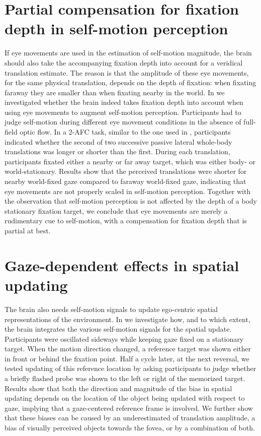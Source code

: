 \section{Partial compensation for fixation depth in self-motion perception}
If eye movements are used in the estimation of self-motion magnitude, the brain should also take the accompanying fixation depth into account for a veridical translation estimate. The reason is that the amplitude of these eye movements, for the same physical translation, depends on the depth of fixation: when fixating faraway they are smaller than when fixating nearby in the world.  In  we investigated whether the brain indeed takes fixation depth into account when using eye movements to augment self-motion perception. Participants had to judge self-motion during different eye movement conditions in the absence of full-field optic flow. In a 2-AFC task, similar to the one used in , participants indicated whether the second of two successive passive lateral whole-body translations was longer or shorter than the first. During each translation, participants fixated either a nearby or far away target, which was either body- or world-stationary. Results show that the perceived translations were shorter for nearby world-fixed gaze compared to faraway world-fixed gaze, indicating that eye movements are not properly scaled in self-motion perception. Together with the observation that self-motion perception is not affected by the depth of a body stationary fixation target, we conclude that eye movements are merely a rudimentary cue to self-motion, with a compensation for fixation depth that is partial at best.

\section{Gaze-dependent effects in spatial updating}
The brain also needs self-motion signals to update ego-centric spatial representations of the environment. In  we investigate how, and to which extent, the brain integrates the various self-motion signals for the spatial update. Participants were oscillated sideways while keeping gaze fixed on a stationary target. When the motion direction changed, a reference target was shown either in front or behind the fixation point. Half a cycle later, at the next reversal, we tested updating of this reference location by asking participants to judge whether a briefly flashed probe was shown to the left or right of the memorized target. Results show that both the direction and magnitude of the bias in spatial updating depends on the location of the object being updated with respect to gaze, implying that a gaze-centered reference frame is involved. We further show that these biases can be caused by an underestimated of translation amplitude, a bias of visually perceived objects towards the fovea, or by a combination of both.

